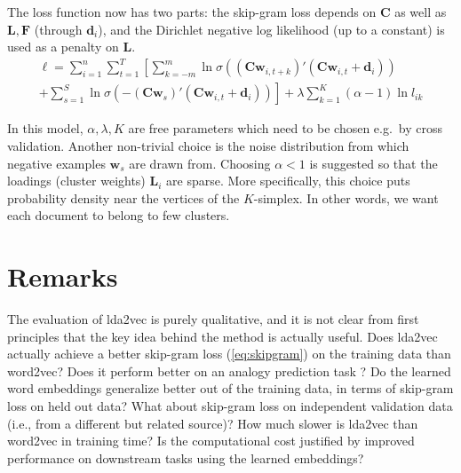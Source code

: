 \documentclass{amsart}
\newcommand\vd{\symbf{d}}
\newcommand\vw{\symbf{w}}
\newcommand\mc{\symbf{C}}
\newcommand\ml{\symbf{L}}
\newcommand\mf{\symbf{F}}
\begin{document}
The loss function now has two parts: the skip-gram loss depends on \(\mc\) as
well as \(\ml, \mf\) (through \(\vd_i\)), and the Dirichlet negative log
likelihood (up to a constant) is used as a penalty on \(\ml\).
%
\begin{multline}
  \ell = \sum_{i=1}^n \sum_{t=1}^T \left[ \sum_{k=-m}^m
    \ln\sigma((\mc\vw_{i,t+k})' (\mc\vw_{i,t} + \vd_i)) \right.\\
    + \left.\sum_{s=1}^S \ln\sigma(-(\mc\vw_s)' (\mc\vw_{i,t} + \vd_i)) \right]
  + \lambda \sum_{k=1}^K (\alpha - 1) \ln l_{ik}
\end{multline}

In this model, \(\alpha, \lambda, K\) are free parameters which need to be
chosen e.g.~by cross validation. Another non-trivial choice is the noise
distribution from which negative examples \(\vw_s\) are drawn from. Choosing
\(\alpha < 1\) is suggested so that the loadings (cluster weights) \(\ml_i\)
are sparse. More specifically, this choice puts probability density near the
vertices of the \(K\)-simplex. In other words, we want each document to belong
to few clusters.

\section{Remarks}

The evaluation of lda2vec is purely qualitative, and it is not clear from first
principles that the key idea behind the method is actually useful. Does lda2vec
actually achieve a better skip-gram loss (\ref{eq:skipgram}) on the training
data than word2vec? Does it perform better on an analogy prediction task
\cite{Mikolov2013b}? Do the learned word embeddings generalize better out of
the training data, in terms of skip-gram loss on held out data? What about
skip-gram loss on independent validation data (i.e., from a different but
related source)? How much slower is lda2vec than word2vec in training time? Is
the computational cost justified by improved performance on downstream tasks
using the learned embeddings?

\printbibliography
\end{document}
